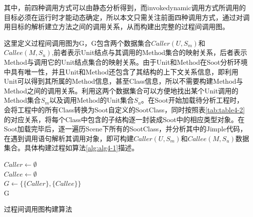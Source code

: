 其中，前四种调用方式可以由静态分析得到，而invokedynamic调用方式所调用的目标必须在运行时才能动态确定，所以本文只需关注前面四种调用方式，通过对调用目标的解析建立方法之间的调用关系，从而构建出完整的过程间调用图。

这里定义过程间调用图为G，G包含两个数据集合$Caller(U,S_m)$和$Callee(M,S_u)$,前者表示Unit结点与其调用的Method集合的映射关系，后者表示Method与调用它的Unit结点集合的映射关系。由于Unit和Method在Soot分析环境中具有唯一性，并且Unit和Method还包含了其结构的上下文关系信息，即利用Unit可以得到其所属的Method信息，甚至Class信息，所以不需要构建Method与Method之间的调用关系。利用这两个数据集合可以方便地找出某个Unit调用的Method集合$S_m$以及调用Method的Unit集合$S_u$。在Soot开始加载待分析工程时，会将工程中的所有Class转换为Soot自定义的SootClass，同时按照表\ref{tab:table4-2}的对应关系，将每个Class中包含的子结构逐一封装成Soot中的相应类型对象。在Soot加载完毕后，逐一遍历Scene下所有的SootClass，并分析其中的Jimple代码，在遇到调用语句解析其调用对象，即可构建$Caller(U,S_m)$和$Callee(M,S_u)$数据集合。具体构建过程如算法\ref{alg:alg4-1}描述。

\begin{algorithm}%
	\LinesNumbered
	$Caller \leftarrow \emptyset$ \\
	$Callee \leftarrow \emptyset$ \\
	$G \leftarrow \{\{Caller\},\{Callee\}\}$ \\
	\Return G
	\caption{过程间调用图构建算法}
	\label{alg:alg4-1}
\end{algorithm}

